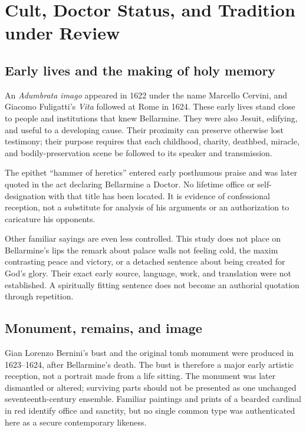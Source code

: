 \section{Cult, Doctor Status, and Tradition under Review}

\subsection{Early lives and the making of holy memory}

An \emph{Adumbrata imago} appeared in 1622 under the name Marcello Cervini,
and Giacomo Fuligatti's \emph{Vita} followed at Rome in 1624.  These early
lives stand close to people and institutions that knew Bellarmine.  They were
also Jesuit, edifying, and useful to a developing cause.  Their proximity can
preserve otherwise lost testimony; their purpose requires that each childhood,
charity, deathbed, miracle, and bodily-preservation scene be followed to its
speaker and transmission.

The epithet ``hammer of heretics'' entered early posthumous praise and was
later quoted in the act declaring Bellarmine a Doctor.  No lifetime office or
self-designation with that title has been located.  It is evidence of
confessional reception, not a substitute for analysis of his arguments or an
authorization to caricature his opponents.

Other familiar sayings are even less controlled.  This study does not place
on Bellarmine's lips the remark about palace walls not feeling cold, the maxim
contrasting peace and victory, or a detached sentence about being created for
God's glory.  Their exact early source, language, work, and translation were
not established.  A spiritually fitting sentence does not become an
authorial quotation through repetition.

\subsection{Monument, remains, and image}

Gian Lorenzo Bernini's bust and the original tomb monument were produced in
1623--1624, after Bellarmine's death.  The bust is therefore a major early
artistic reception, not a portrait made from a life sitting.  The monument was
later dismantled or altered; surviving parts should not be presented as one
unchanged seventeenth-century ensemble.  Familiar paintings and prints of a
bearded cardinal in red identify office and sanctity, but no single common
type was authenticated here as a secure contemporary likeness.

